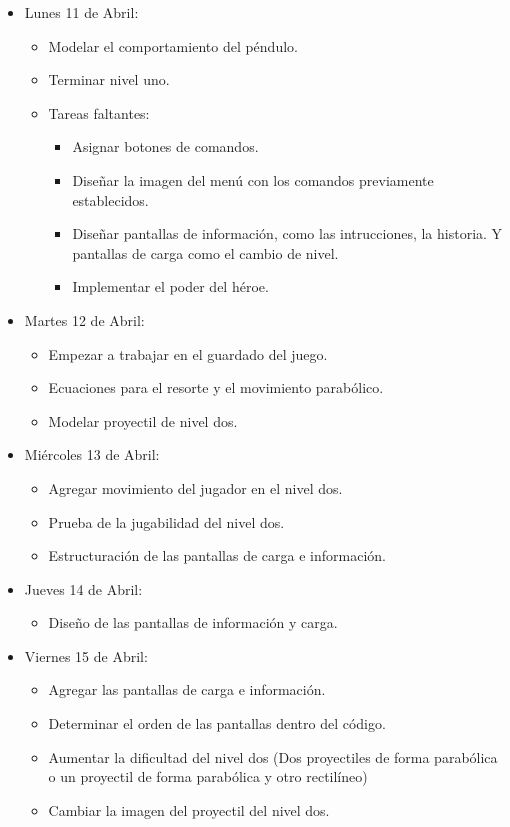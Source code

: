 \documentclass{article}
\begin{document}
\begin{itemize}
    \item Lunes 11 de Abril:
    \begin{itemize}
        \item Modelar el comportamiento del péndulo.
        \item Terminar nivel uno.
        
        \item Tareas faltantes:
        \begin{itemize}
            \item Asignar botones de comandos.
            \item Diseñar la imagen del menú con los comandos previamente establecidos.
            \item Diseñar pantallas de información, como las intrucciones, la historia. Y pantallas de carga como el cambio de nivel.
            \item Implementar el poder del héroe.
        \end{itemize}
    \end{itemize}
    
    \item Martes 12 de Abril:
    \begin{itemize}
        \item Empezar a trabajar en el guardado del juego.
        \item Ecuaciones para el resorte y el movimiento parabólico.
        \item Modelar proyectil de nivel dos.
    \end{itemize}
    
    \item Miércoles 13 de Abril:
    \begin{itemize}
        \item Agregar movimiento del jugador en el nivel dos.
        \item Prueba de la jugabilidad del nivel dos.
        \item Estructuración de las pantallas de carga e información.
    \end{itemize}
    
    \item Jueves 14 de Abril:
    \begin{itemize}
        \item Diseño de las pantallas de información y carga.
    \end{itemize}
    
    \item Viernes 15 de Abril:
    \begin{itemize}
        \item Agregar las pantallas de carga e información.
        \item Determinar el orden de las pantallas dentro del código.
        \item Aumentar la dificultad del nivel dos (Dos proyectiles de forma parabólica o un proyectil de forma parabólica y otro rectilíneo)
        \item Cambiar la imagen del proyectil del nivel dos.
    \end{itemize}
    

\end{itemize}
\end{document}
